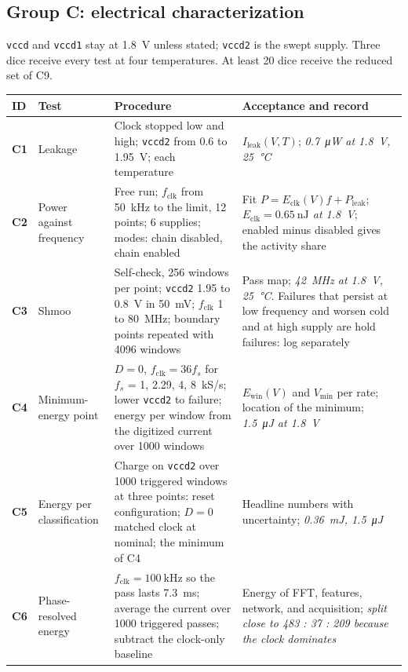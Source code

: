\documentclass[10pt]{article}
\newcommand{\tid}[1]{\textbf{#1}}
\newcommand{\pred}[1]{\textit{#1}}
\begin{document}
\subsection*{Group C: electrical characterization}
\texttt{vccd} and \texttt{vccd1} stay at \SI{1.8}{\volt} unless stated;
\texttt{vccd2} is the swept supply. Three dice receive every test at
four temperatures. At least 20 dice receive the reduced set of C9.
{\small
\begin{longtable}{@{}L{0.8cm}L{3.3cm}L{6.6cm}L{4.3cm}@{}}
\toprule
ID & Test & Procedure & Acceptance and record\\
\midrule
\endhead
\tid{C1} & Leakage & Clock stopped low and high; \texttt{vccd2} from 0.6 to \SI{1.95}{\volt}; each temperature & $I_{\mathrm{leak}}(V,T)$; \pred{\SI{0.7}{\micro\watt} at \SI{1.8}{\volt}, \SI{25}{\celsius}}\\
\tid{C2} & Power against frequency & Free run; $f_{\mathrm{clk}}$ from \SI{50}{\kilo\hertz} to the limit, 12 points; 6 supplies; modes: chain disabled, chain enabled & Fit $P=E_{\mathrm{clk}}(V)f+P_{\mathrm{leak}}$; \pred{$E_{\mathrm{clk}}=\SI{0.65}{\nano\joule}$ at \SI{1.8}{\volt}}; enabled minus disabled gives the activity share\\
\tid{C3} & Shmoo & Self-check, 256 windows per point; \texttt{vccd2} 1.95 to \SI{0.8}{\volt} in \SI{50}{\milli\volt}; $f_{\mathrm{clk}}$ 1 to \SI{80}{\mega\hertz}; boundary points repeated with 4096 windows & Pass map; \pred{\SI{42}{\mega\hertz} at \SI{1.8}{\volt}, \SI{25}{\celsius}}. Failures that persist at low frequency and worsen cold and at high supply are hold failures: log separately\\
\tid{C4} & Minimum-energy point & $D=0$, $f_{\mathrm{clk}}=36f_s$ for $f_s$ = 1, 2.29, 4, 8~kS/s; lower \texttt{vccd2} to failure; energy per window from the digitized current over 1000 windows & $E_{\mathrm{win}}(V)$ and $V_{\min}$ per rate; location of the minimum; \pred{\SI{1.5}{\micro\joule} at \SI{1.8}{\volt}}\\
\tid{C5} & Energy per classification & Charge on \texttt{vccd2} over 1000 triggered windows at three points: reset configuration; $D=0$ matched clock at nominal; the minimum of C4 & Headline numbers with uncertainty; \pred{\SI{0.36}{\milli\joule}, \SI{1.5}{\micro\joule}}\\
\tid{C6} & Phase-resolved energy & $f_{\mathrm{clk}}=\SI{100}{\kilo\hertz}$ so the pass lasts \SI{7.3}{\milli\second}; average the current over 1000 triggered passes; subtract the clock-only baseline & Energy of FFT, features, network, and acquisition; \pred{split close to 483 : 37 : 209 because the clock dominates}\\

\end{longtable}}
\end{document}

